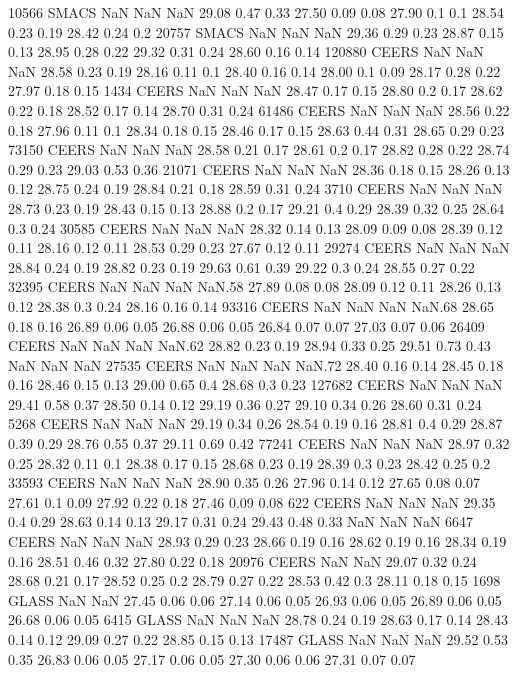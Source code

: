 10566 SMACS  NaN  NaN  NaN 29.08 0.47 0.33  27.50 0.09 0.08  27.90 0.1 0.1  28.54 0.23 0.19    28.42 0.24 0.2
20757 SMACS  NaN  NaN  NaN 29.36 0.29 0.23  28.87 0.15 0.13  28.95 0.28 0.22  29.32 0.31 0.24    28.60 0.16 0.14
120880 CEERS  NaN  NaN  NaN 28.58 0.23 0.19  28.16 0.11 0.1  28.40 0.16 0.14  28.00 0.1 0.09  28.17 0.28 0.22  27.97 0.18 0.15
1434 CEERS  NaN  NaN  NaN 28.47 0.17 0.15  28.80 0.2 0.17  28.62 0.22 0.18  28.52 0.17 0.14    28.70 0.31 0.24
61486 CEERS  NaN  NaN  NaN 28.56 0.22 0.18  27.96 0.11 0.1  28.34 0.18 0.15  28.46 0.17 0.15  28.63 0.44 0.31  28.65 0.29 0.23
73150 CEERS  NaN  NaN  NaN 28.58 0.21 0.17  28.61 0.2 0.17  28.82 0.28 0.22  28.74 0.29 0.23    29.03 0.53 0.36
21071 CEERS  NaN  NaN  NaN 28.36 0.18 0.15  28.26 0.13 0.12  28.75 0.24 0.19  28.84 0.21 0.18    28.59 0.31 0.24
3710 CEERS  NaN  NaN  NaN 28.73 0.23 0.19  28.43 0.15 0.13  28.88 0.2 0.17  29.21 0.4 0.29  28.39 0.32 0.25  28.64 0.3 0.24
30585 CEERS  NaN  NaN  NaN 28.32 0.14 0.13  28.09 0.09 0.08  28.39 0.12 0.11  28.16 0.12 0.11  28.53 0.29 0.23  27.67 0.12 0.11
29274 CEERS  NaN  NaN  NaN 28.84 0.24 0.19  28.82 0.23 0.19  29.63 0.61 0.39  29.22 0.3 0.24    28.55 0.27 0.22
32395 CEERS  NaN  NaN  NaN  NaN.58 27.89 0.08 0.08  28.09 0.12 0.11  28.26 0.13 0.12  28.38 0.3 0.24  28.16 0.16 0.14
93316 CEERS  NaN  NaN  NaN  NaN.68 28.65 0.18 0.16  26.89 0.06 0.05  26.88 0.06 0.05  26.84 0.07 0.07  27.03 0.07 0.06
26409 CEERS  NaN  NaN  NaN  NaN.62 28.82 0.23 0.19  28.94 0.33 0.25  29.51 0.73 0.43   NaN  NaN NaN
27535 CEERS  NaN  NaN  NaN  NaN.72 28.40 0.16 0.14  28.45 0.18 0.16  28.46 0.15 0.13  29.00 0.65 0.4  28.68 0.3 0.23
127682 CEERS  NaN  NaN  NaN 29.41 0.58 0.37  28.50 0.14 0.12  29.19 0.36 0.27  29.10 0.34 0.26    28.60 0.31 0.24
5268 CEERS  NaN  NaN  NaN 29.19 0.34 0.26  28.54 0.19 0.16  28.81 0.4 0.29  28.87 0.39 0.29  28.76 0.55 0.37  29.11 0.69 0.42
77241 CEERS  NaN  NaN  NaN 28.97 0.32 0.25  28.32 0.11 0.1  28.38 0.17 0.15  28.68 0.23 0.19  28.39 0.3 0.23  28.42 0.25 0.2
33593 CEERS  NaN  NaN  NaN 28.90 0.35 0.26  27.96 0.14 0.12  27.65 0.08 0.07  27.61 0.1 0.09  27.92 0.22 0.18  27.46 0.09 0.08
622 CEERS  NaN  NaN  NaN 29.35 0.4 0.29  28.63 0.14 0.13  29.17 0.31 0.24  29.43 0.48 0.33   NaN  NaN  NaN
6647 CEERS  NaN  NaN  NaN 28.93 0.29 0.23  28.66 0.19 0.16  28.62 0.19 0.16  28.34 0.19 0.16  28.51 0.46 0.32  27.80 0.22 0.18
20976 CEERS  NaN NaN 29.07 0.32 0.24  28.68 0.21 0.17  28.52 0.25 0.2  28.79 0.27 0.22  28.53 0.42 0.3  28.11 0.18 0.15
1698 GLASS  NaN NaN 27.45 0.06 0.06  27.14 0.06 0.05  26.93 0.06 0.05  26.89 0.06 0.05    26.68 0.06 0.05
6415 GLASS  NaN  NaN  NaN 28.78 0.24 0.19  28.63 0.17 0.14  28.43 0.14 0.12  29.09 0.27 0.22    28.85 0.15 0.13
17487 GLASS  NaN  NaN  NaN 29.52 0.53 0.35  26.83 0.06 0.05  27.17 0.06 0.05  27.30 0.06 0.06    27.31 0.07 0.07
